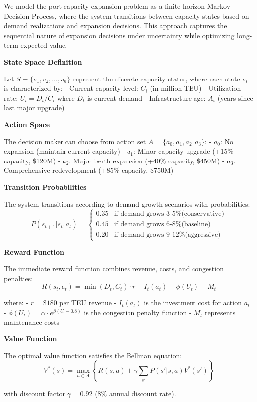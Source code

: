 \documentclass{article}
\begin{document}
We model the port capacity expansion problem as a finite-horizon Markov Decision Process, where the system transitions between capacity states based on demand realizations and expansion decisions. This approach captures the sequential nature of expansion decisions under uncertainty while optimizing long-term expected value.

\textbf{State Space Definition}

Let $S = \{s_1, s_2, \ldots, s_n\}$ represent the discrete capacity states, where each state $s_i$ is characterized by:
- Current capacity level: $C_i$ (in million TEU)
- Utilization rate: $U_i = D_t / C_i$ where $D_t$ is current demand
- Infrastructure age: $A_i$ (years since last major upgrade)

\textbf{Action Space}

The decision maker can choose from action set $A = \{a_0, a_1, a_2, a_3\}$:
- $a_0$: No expansion (maintain current capacity)
- $a_1$: Minor capacity upgrade (+15\% capacity, \$120M)
- $a_2$: Major berth expansion (+40\% capacity, \$450M)
- $a_3$: Comprehensive redevelopment (+85\% capacity, \$750M)

\textbf{Transition Probabilities}

The system transitions according to demand growth scenarios with probabilities:
\[P(s_{t+1} | s_t, a_t) = \begin{cases}
0.35 & \text{if demand grows 3-5\% (conservative)} \\
0.45 & \text{if demand grows 6-8\% (baseline)} \\
0.20 & \text{if demand grows 9-12\% (aggressive)}
\end{cases}\]

\textbf{Reward Function}

The immediate reward function combines revenue, costs, and congestion penalties:
\[R(s_t, a_t) = \min(D_t, C_t) \cdot r - I_t(a_t) - \phi(U_t) - M_t\]

where:
- $r = \$180$ per TEU revenue
- $I_t(a_t)$ is the investment cost for action $a_t$
- $\phi(U_t) = \alpha \cdot e^{\beta(U_t - 0.8)}$ is the congestion penalty function
- $M_t$ represents maintenance costs

\textbf{Value Function}

The optimal value function satisfies the Bellman equation:
\[V^*(s) = \max_{a \in A} \left\{ R(s,a) + \gamma \sum_{s'} P(s'|s,a) V^*(s') \right\}\]

with discount factor $\gamma = 0.92$ (8\% annual discount rate).
\end{document}
